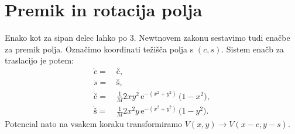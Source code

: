 \documentclass[10pt]{article}
\newcommand{\euler}{\mathrm{e}}
\begin{document}
\section{Premik in rotacija polja}
Enako kot za sipan delec lahko po 3. Newtnovem zakonu sestavimo tudi enačbe za premik polja.
Označimo koordinati težišča polja s $(c,s)$.
Sistem enačb za traslacijo je potem:
\begin{equation}
       \begin{split}
              \dot{c} = &\, č, \\
              \dot{s} = &\, š, \\
              \dot{č} = &\, \frac{1}{M} 2xy^2 \, \euler^{-(x^2+y^2)} \, \bigl( 1 - x^2 \bigr), \\
              \dot{š} = &\, \frac{1}{M} 2x^2y \, \euler^{-(x^2+y^2)} \, \bigl( 1 - y^2 \bigr).
       \end{split}
       \label{eq:sistem2}
\end{equation}
Potencial nato na vsakem koraku transformiramo $V(x,y) \rightarrow V(x-c,y-s)$.
\end{document}

